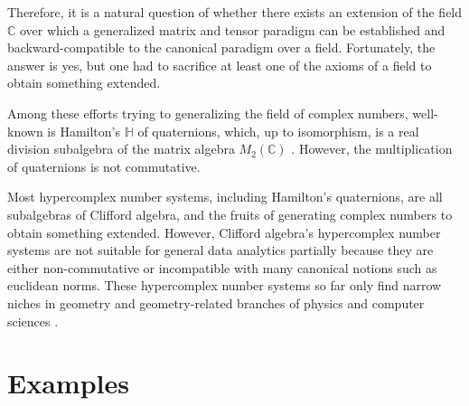 \documentclass[12pt,reqno]{amsart}
\numberwithin{equation}{section}
\numberwithin{figure}{section}
\numberwithin{table}{section}
\theoremstyle{definition}
\begin{document}
Therefore, it is a natural question of whether there exists an extension of the field $\mathbb{C}$ over which a generalized matrix and tensor paradigm can be established and backward-compatible to the canonical paradigm over a field. Fortunately, the answer is yes, but one had to sacrifice at least one of the axioms of a field to obtain something extended. 


Among these efforts trying to generalizing the field of complex numbers, well-known is  Hamilton's $\mathbb{H}$
of quaternions, which, up to isomorphism, is a real division subalgebra of the matrix algebra $M_2(\mathbb{C})$ \cite{hamilton1848xi,history,hilgert2011structure}. However, the multiplication of quaternions is not commutative. 


Most hypercomplex number systems, including Hamilton's quaternions, are all subalgebras of Clifford algebra, and the fruits of generating complex numbers to obtain something extended. However, Clifford algebra's hypercomplex number systems are not suitable for general data analytics partially because they are either non-commutative or incompatible with many canonical notions such as euclidean norms. These hypercomplex number systems so far only find narrow niches in geometry and geometry-related branches of physics and computer sciences \cite{hestenes2003reforming,ablamowicz2004lectures}.





\section{Examples}


%



\end{document}
